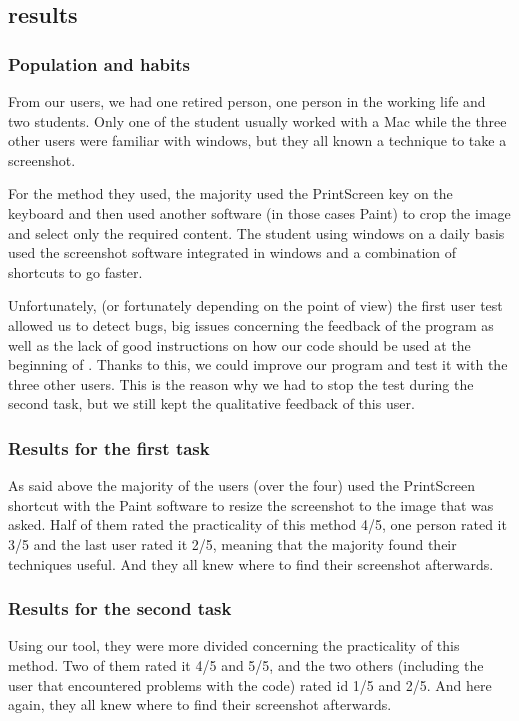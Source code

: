 \subsection{results}
\subsubsection*{Population and habits}
From our users, we had one retired person, one person in the working life and two students. Only one of the student usually worked with a Mac while the three other users were familiar with windows, but they all known a technique to take a screenshot.

For the method they used, the majority used the PrintScreen key on the keyboard and then used another software (in those cases Paint) to crop the image and select only the required content. The student using windows on a daily basis used the screenshot software integrated in windows and a combination of shortcuts to go faster.

Unfortunately, (or fortunately depending on the point of view) the first user test allowed us to detect bugs, big issues concerning the feedback of the program as well as the lack of good instructions on how our code should be used at the beginning of . Thanks to this, we could improve our program and test it with the three other users. This is the reason why we had to stop the test during the second task, but we still kept the qualitative feedback of this user.
\subsubsection*{Results for the first task}
As said above the majority of the users (over the four) used the PrintScreen shortcut with the Paint software to resize the screenshot to the image that was asked.
Half of them rated the practicality of this method 4/5, one person rated it 3/5 and the last user rated it 2/5, meaning that the majority found their techniques useful.
And they all knew where to find their screenshot afterwards.

\subsubsection*{Results for the second task}
Using our tool, they were more divided concerning the practicality of this method. Two of them rated it 4/5 and 5/5, and the two others (including the user that encountered problems with the code)  rated id 1/5 and 2/5.
And here again, they all knew where to find their screenshot afterwards.

